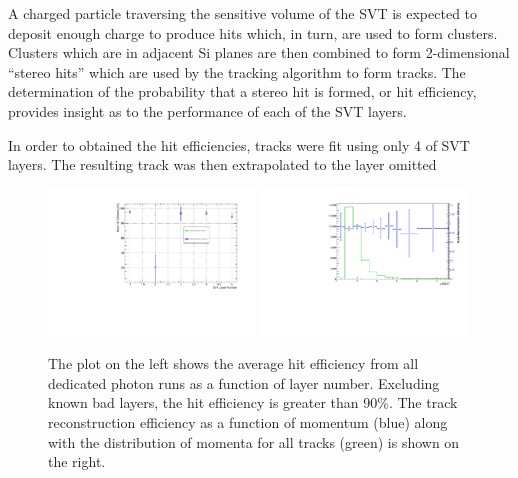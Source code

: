 
%
%
 
A charged particle traversing the sensitive volume of the SVT is expected to
deposit enough charge to produce hits which, in turn, are used to form 
clusters. Clusters which are in adjacent Si planes are then combined to form
2-dimensional ``stereo hits'' which are used by the tracking algorithm to 
form tracks.  The determination of the probability that a stereo hit is 
formed, or hit efficiency, provides insight as to the performance of each of 
the SVT layers.

In order to obtained the hit efficiencies, tracks were fit using only 4 of 
SVT layers. The resulting track was then extrapolated to the layer omitted
\begin{figure}[h]
    \begin{center}
    	\includegraphics[width=0.49\textwidth]{test2012/svtperformance/trk_performance/mean_hit_efficiency_vs_layer.pdf}
    	\includegraphics[width=0.49\textwidth]{test2012/svtperformance/trk_performance/track_reco_efficiency.pdf}
        \caption{
                    The plot on the left shows the average hit efficiency
                    from all dedicated photon runs as a function of layer
                    number.  Excluding known bad layers, the hit efficiency
                    is greater than 90\%. The track reconstruction efficiency
                    as a function of momentum (blue) along with the 
                    distribution of momenta for all tracks (green) is shown
                    on the right.
                } 
	\label{fig:hit_track_efficiency}
    \end{center}
\end{figure}
